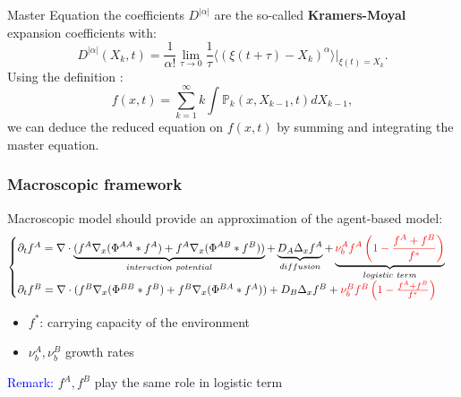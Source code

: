 \documentclass[10pt]{beamer}
\def \p {{\partial}}
\theoremstyle{remark}
\newcommand\Fontvii{\fontsize{9}{7.2}\selectfont}
\begin{document}
\begin{frame}{Master Equation}
the coefficients $D^{\vert \alpha \vert}$ are the so-called\textbf{ Kramers-Moyal} expansion coefficients with:
\begin{equation*}
D^{\vert \alpha \vert} (X_k, t) = \dfrac{1}{\alpha !} \lim_{\tau \rightarrow 0} \dfrac{1}{\tau} \langle (\xi(t+\tau) - X_k)^{\alpha} \rangle \vert_{\xi(t)=X_k}.
\end{equation*}
Using the definition : $$f(x,t) =  \sum_{k=1}^{\infty} k \int \mathbb{P}_k(x, X_{k-1}, t)dX_{k-1},$$
we can deduce the reduced equation on $f(x,t)$ by summing and integrating the master equation. 
\end{frame}


\begin{frame}
\frametitle{Macroscopic framework}
\Fontvii
Macroscopic model should provide an approximation of the agent-based model:
	\begin{equation*}
\begin{cases}
\p_t f^{A}=  \nabla \cdot \underbrace{(f^A\nabla_x(\Phi^{AA}* f^A) + f^A \nabla_x( \Phi^{AB}*f^B))}_{interaction \ potential} + \underbrace{ D_A \Delta_x f^A}_{diffusion} + \underbrace{ \textcolor{red}{\nu_{b}^{A}f^A\left( 1-\frac{f^A+f^B}{f^{*}} \right)}}_{logistic \ term} \\

\p_t f^{B}=  \nabla \cdot (f^B\nabla_x(\Phi^{BB}* f^B) + f^B \nabla_x (\Phi^{BA}*f^A)) + D_B \Delta_x f^B + \textcolor{red}{\nu_{b}^{B}f^B\left( 1-\frac{f^A+f^B}{f^{*}} \right)}
\end{cases}
\end{equation*}
\begin{itemize}
	\item  $f^*$: carrying capacity of the environment
	\item $\nu_{b}^{A},\nu_{b}^{B}$ growth rates
\end{itemize}
\vspace{0.5cm}

\textcolor{blue}{Remark:}
	$f^{A},f^{B}$ play the same role in logistic term


\end{frame}
\end{document}
